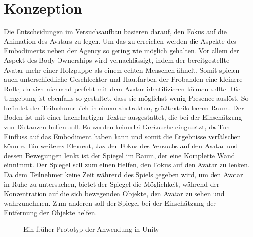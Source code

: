 \section{Konzeption}
Die Entscheidungen im Versuchsaufbau basieren darauf, den Fokus auf die Animation des Avatars zu legen. Um das zu erreichen werden die Aspekte des Embodiments neben der Agency so gering wie möglich gehalten. Vor allem der Aspekt des Body Ownerships wird vernachlässigt, indem der bereitgestellte Avatar mehr einer Holzpuppe als einem echten Menschen ähnelt. Somit spielen auch unterschiedliche Geschlechter und Hautfarben der Probanden eine kleinere Rolle, da sich niemand perfekt mit dem Avatar identifizieren können sollte. Die Umgebung ist ebenfalls so gestaltet, dass sie möglichst wenig Presence auslöst. So befindet der Teilnehmer sich in einem abstrakten, größtenteils leeren Raum. Der Boden ist mit einer kachelartigen Textur ausgestattet, die bei der Einschätzung von Distanzen helfen soll. Es werden keinerlei Geräusche eingesetzt, da Ton Einfluss auf das Embodiment haben kann und somit die Ergebnisse verfälschen könnte. 
Ein weiteres Element, das den Fokus des Versuchs auf den Avatar und dessen Bewegungen lenkt ist der Spiegel im Raum, der eine Komplette Wand einnimmt. Der Spiegel soll zum einen Helfen, den Fokus auf den Avatar zu lenken. Da dem Teilnehmer keine Zeit während des Spiels gegeben wird, um den Avatar in Ruhe zu untersuchen, bietet der Spiegel die Möglichkeit, während der Konzentration auf die sich bewegenden Objekte, den Avatar zu sehen und wahrzunehmen. Zum anderen soll der Spiegel bei der Einschätzung der Entfernung der Objekte helfen.

\begin{figure}[h]
  \caption[Altes Setup der Anwendung]{Ein früher Prototyp der Anwendung in Unity}
  \label{fig:oldSetup}
\end{figure}

